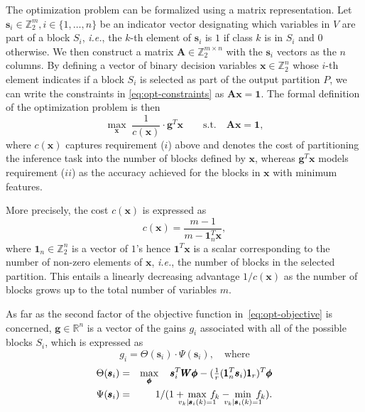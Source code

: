 \documentclass[journal]{IEEEtran}
\theoremstyle{plain} %
\newcommand{\ie}{\textit{i.e.},\xspace}
\begin{document}
The optimization problem can be formalized using a matrix representation.
Let $\pmb{s}_i \in \mathbb{Z}_2^m, i \in \{1,\dots,n\}$ be an indicator vector designating which variables in $V$ are part of a block $S_i$, \ie the $k$-th element of $\pmb{s}_i$ is $1$ if class $k$ is in $S_i$ and $0$ otherwise. We then construct a matrix $\pmb{A} \in \mathbb{Z}_2^{m \times n}$ with the $\pmb{s}_i$ vectors as the $n$ columns.
By defining a vector of binary decision variables $\pmb{x} \in \mathbb{Z}_2^n$ whose $i$-th element indicates if a block $S_i$ is selected as part of the output partition $P$, we can write the constraints in \eqref{eq:opt-constraints} as $\pmb{Ax}=\pmb{1}$.
%
The formal definition of the optimization problem is then
\begin{equation}
\max_{\pmb{x}} \; \frac{1}{c(\pmb{x})}\cdot\pmb{g}^T\pmb{x} \qquad \text{s.t.} \quad \pmb{Ax}=\pmb{1},
\label{eq:opt-objective}
\end{equation}
where $c(\pmb{x})$ captures requirement ($i$) above and denotes the cost of partitioning the inference task into the number of blocks defined by $\pmb{x}$, whereas $\pmb{g}^T\pmb{x}$ models requirement ($ii$) as the accuracy achieved for the blocks in $\pmb{x}$ with minimum features.

More precisely, the cost $c(\pmb{x})$ is expressed as
\begin{equation}
    c(\pmb{x})=\frac{m-1}{m-\pmb{1}_n^T\pmb{x}},
    \label{eq:opt-cost}
\end{equation}
where $\pmb{1}_n\in\mathbb{Z}_2^n$ is a vector of $1$'s hence $\pmb{1}^T\pmb{x}$ is a scalar corresponding to the number of non-zero elements of $\pmb{x}$, \ie the number of blocks in the selected partition. This entails a linearly decreasing advantage $1/c(\pmb{x})$ as the number of blocks grows up to the total number of variables $m$.

As far as the second factor of the objective function in~\eqref{eq:opt-objective} is concerned, $\pmb{g} \in \mathbb{R}^n$ is a vector of the gains $g_i$ associated with all of the possible blocks $S_i$, which is expressed as
\begin{equation}
    g_i = \Theta(\pmb{s}_i) \cdot \Psi(\pmb{s}_i), \quad\text{where}\label{eq:opt-gain}
\end{equation}
\begin{eqnarray}
    \Theta(\pmb{s}_i) &=& \max_{\pmb{\phi}} \quad \pmb{s}_i^T\pmb{W\phi} - (\tfrac{1}{r}(\pmb{1}_n^T\pmb{s}_i)\pmb{1}_r)^T\pmb{\phi} \label{eq:opt-gain-theta} \\
    \Psi(\pmb{s}_i) &=& 1/(1 + \hspace*{-8pt}\max_{v_k|\pmb{s}_i(k)=1} \hspace*{-8pt} f_k - \hspace*{-8pt}\min_{v_k|\pmb{s}_i(k)=1} \hspace*{-8pt} f_k). \label{eq:opt-gain-psi}
\end{eqnarray}
\end{document}
